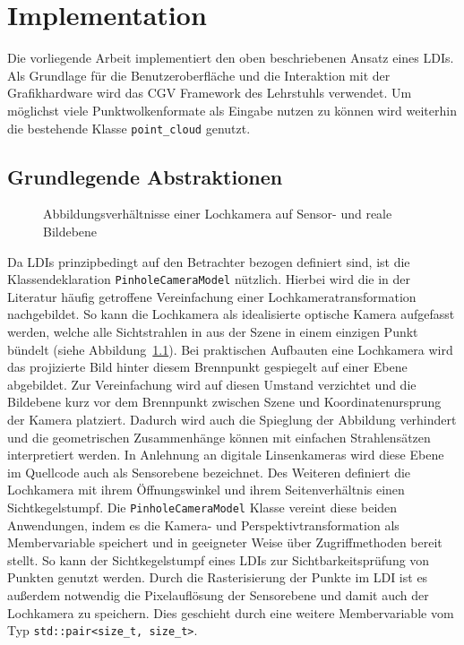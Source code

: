 \documentclass[hyperref, beleg, german]{cgvpub}
\begin{document}
\chapter{Implementation}

Die vorliegende Arbeit implementiert den oben beschriebenen Ansatz eines LDIs.
Als Grundlage für die Benutzeroberfläche und die Interaktion mit der
Grafikhardware wird das CGV Framework des Lehrstuhls verwendet. Um möglichst
viele Punktwolkenformate als Eingabe nutzen zu können wird weiterhin die
bestehende Klasse \texttt{point\_cloud} genutzt.

\section{Grundlegende Abstraktionen}

\begin{figure}
	\centering
	
	\caption{Abbildungsverhältnisse einer Lochkamera auf Sensor- und reale
		Bildebene}%
	\label{fig:pinholecamera}
\end{figure}

Da LDIs prinzipbedingt auf den Betrachter bezogen definiert sind, ist die
Klassendeklaration \texttt{PinholeCameraModel} nützlich. Hierbei wird die in
der Literatur häufig getroffene Vereinfachung einer Lochkameratransformation
nachgebildet. So kann die Lochkamera als idealisierte optische Kamera
aufgefasst werden, welche alle Sichtstrahlen in aus der Szene in einem einzigen
Punkt bündelt (siehe Abbildung~\ref{fig:pinholecamera}). Bei praktischen
Aufbauten eine Lochkamera wird das projizierte Bild hinter diesem Brennpunkt
gespiegelt auf einer Ebene abgebildet. Zur Vereinfachung wird auf diesen
Umstand verzichtet und die Bildebene kurz vor dem Brennpunkt zwischen Szene und
Koordinatenursprung der Kamera platziert. Dadurch wird auch die Spieglung der
Abbildung verhindert und die geometrischen Zusammenhänge können mit einfachen
Strahlensätzen interpretiert werden. In Anlehnung an digitale Linsenkameras
wird diese Ebene im Quellcode auch als Sensorebene bezeichnet. Des Weiteren
definiert die Lochkamera mit ihrem Öffnungswinkel und ihrem Seitenverhältnis
einen Sichtkegelstumpf. Die \texttt{PinholeCameraModel} Klasse vereint diese
beiden Anwendungen, indem es die Kamera- und Perspektivtransformation als
Membervariable speichert und in geeigneter Weise über Zugriffmethoden bereit
stellt. So kann der Sichtkegelstumpf eines LDIs zur Sichtbarkeitsprüfung von
Punkten genutzt werden. Durch die Rasterisierung der Punkte im LDI ist es
außerdem notwendig die Pixelauflösung der Sensorebene und damit auch der
Lochkamera zu speichern. Dies geschieht durch eine weitere Membervariable vom
Typ \texttt{std::pair<size\_t, size\_t>}.
\end{document}
